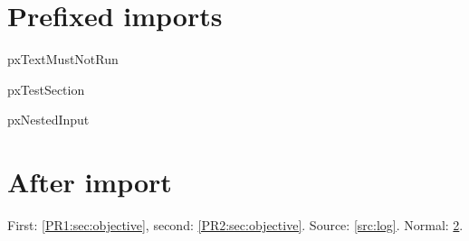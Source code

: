 \documentclass{article}
\begin{document}
\section{Prefixed imports}
\ifcsname pxTextMustNotRun\endcsname
  \PackageError{pxSRC-defaults}{Literal text unexpectedly executed}{}
\fi
\ifcsname pxTestSection\endcsname\else
  \PackageError{pxSRC-defaults}{Heading mode override failed}{}
\fi
\ifcsname pxNestedInput\endcsname\else
  \PackageError{pxSRC-defaults}{Source-relative child input regressed}{}
\fi
\section{After import}\label{sec:after}
First: \ref{PR1:sec:objective}, second: \cref{PR2:sec:objective}.
Source: \ref{src:log}. Normal: \ref{sec:after}.
\end{document}
